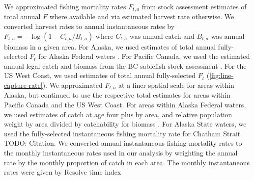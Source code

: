 \documentclass{article}
\newcommand{\lr}[1]{{\color{blue}#1}}
\begin{document}
We approximated fishing mortality rates $F_{t,a}$ from stock assessment estimates of total annual $F$ where available and via estimated harvest rate otherwise. We converted harvest rates to annual instantaneous rates by $F_{t,a} = -\log \left( 1 - C_{t,a} / B_{t,a} \right)$ where $C_{t,a}$ was annual catch and $B_{t,a}$ was annual biomass in a given area. For Alaska, we used estimates of total annual fully-selected $F_t$ for Alaska Federal waters \cite[]{hanselman2019}. For Pacific Canada, we used the estimated annual legal catch and biomass from the BC sablefish stock assessment \cite[][]{dfo2020}. For the US West Coast, we used estimates of total annual fully-selected $F_t$ \cite[]{haltuch2019} (\autoref{fig:line-capture-rate}). We approximated $F_{t,a}$ at a finer spatial scale for areas within Alaska, but continued to use the respective total estimates for areas within Pacific Canada and the US West Coast. For areas within Alaska Federal waters, we used estimates of catch at age four plus by area, and relative population weight by area divided by catchability for biomass \cite[described in][]{hanselman2015}. For Alaska State waters, we used the fully-selected instantaneous fishing mortality rate for Chatham Strait \lr{TODO: Citation}. We converted annual instantaneous fishing mortality rates to the monthly instantaneous rates used in our analysis by weighting the annual rate by the monthly proportion of catch in each area. The monthly instantaneous rates were given by \lr{Resolve time index}
\end{document}
